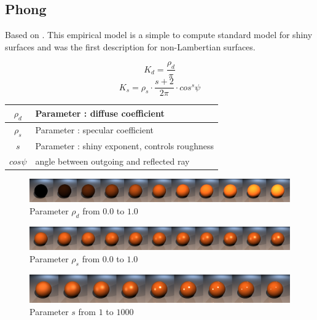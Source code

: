 \documentclass[11pt,a4paper]{article}
\begin{document}
\newpage
\subsection{Phong}
Based on \cite{Pho75}. This empirical model is a simple to compute standard model for shiny surfaces and was the first description for non-Lambertian surfaces.

\begin{equation}
K_d = \frac{\rho_d}{\pi}
\end{equation}
\begin{equation}
K_s = \rho_s \cdot \frac{s+2}{2\pi} \cdot cos^s\psi
\end{equation}

\begin{table}[H]
\begin{tabular}{| c | l |}
\hline
$\rho_d$ & Parameter : diffuse coefficient\\ \hline
$\rho_s$ & Parameter : specular coefficient\\ \hline
$s$ & Parameter : shiny exponent, controls roughness\\ \hline
$cos\psi$ & angle between outgoing and reflected ray\\ \hline
\end{tabular}
\end{table}


\begin{figure}[H]
\includegraphics[width=\textwidth]{phongdiffcomplete.png}
\caption{Parameter $\rho_d$ from $0.0$ to $1.0$}
\end{figure}

\begin{figure}[H]
\includegraphics[width=\textwidth]{phongspeccomplete.png}
\caption{Parameter $\rho_s$ from $0.0$ to $1.0$}
\end{figure}

\begin{figure}[H]
\includegraphics[width=\textwidth]{phongshinecomplete.png}
\caption{Parameter $s$ from $1$ to $1000$}
\end{figure}
\end{document}
